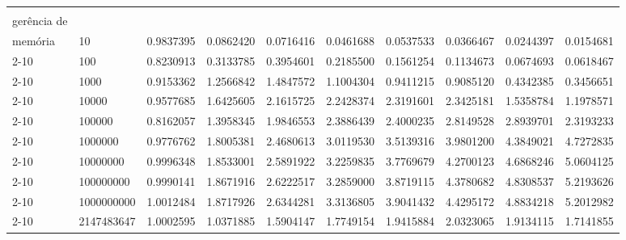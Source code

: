 \begin{flushleft}
{\begin{tabular}{|p{1.5cm}|p{1.2cm}|p{1.3cm}|p{1.3cm}|p{1.3cm}|p{1.3cm}|p{1.3cm}|p{1.3cm}|p{1.3cm}|p{1.3cm}|}
\rule{0pt}{4ex}\multirow{9}{*}{\shortstack[l]{\textit{Speedup} sem\\gerência de \\memória}} 
&10 				& 	0.9837395 		& 0.0862420 		& 0.0716416 		& 0.0461688 		& 0.0537533 		& 0.0366467 		& 0.0244397 		& 0.0154681		\\\cline{2-10}
&100				&	0.8230913 		& 0.3133785 		& 0.3954601 		& 0.2185500 		& 0.1561254 		& 0.1134673 		& 0.0674693 		& 0.0618467		\\\cline{2-10}
&1000			& 	0.9153362 		& 1.2566842 		& 1.4847572 		& 1.1004304 		& 0.9411215 		& 0.9085120 		& 0.4342385 		& 0.3456651		\\\cline{2-10}
&10000 			& 	0.9577685 		& 1.6425605 		& 2.1615725 		& 2.2428374 		& 2.3191601 		& 2.3425181 		& 1.5358784 		& 1.1978571		\\\cline{2-10}
&100000 			& 	0.8162057 		& 1.3958345 		& 1.9846553 		& 2.3886439 		& 2.4000235	 	& 2.8149528 		& 2.8939701 		& 2.3193233		\\\cline{2-10}
&1000000			& 	0.9776762 		& 1.8005381 		& 2.4680613 		& 3.0119530 		& 3.5139316 		& 3.9801200 		& 4.3849021 		& 4.7272835		\\\cline{2-10}
&10000000 		& 	0.9996348 		& 1.8533001 		& 2.5891922 		& 3.2259835 		& 3.7769679 		& 4.2700123 		& 4.6868246 		& 5.0604125		\\\cline{2-10}
&100000000 		&	0.9990141 		& 1.8671916	 	& 2.6222517	 	& 3.2859000 		& 3.8719115 		& 4.3780682 		& 4.8308537 		& 5.2193626		\\\cline{2-10}
&1000000000		& 	1.0012484 		& 1.8717926 		& 2.6344281 		& 3.3136805 		& 3.9041432	 	& 4.4295172 		& 4.8834218 		& 5.2012982		\\\cline{2-10}
&2147483647		& 	1.0002595	 	& 1.0371885	 	& 1.5904147	 	& 1.7749154	 	& 1.9415884	 	& 2.0323065	 	& 1.9134115		& 1.7141855		\\\hline
\end{tabular}
}
\end{flushleft}

